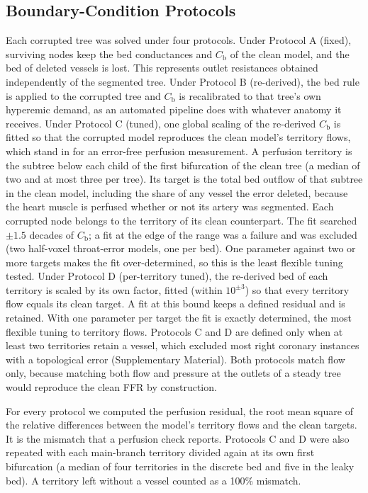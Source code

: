 \documentclass[journal,twoside,web]{ieeecolor}
\begin{document}
\subsection{Boundary-Condition Protocols}
Each corrupted tree was solved under four protocols. Under Protocol A (fixed), surviving
nodes keep the bed conductances and $C_\mathrm{b}$ of the clean model, and the bed of deleted vessels is lost. This represents
outlet resistances obtained independently of the segmented tree. Under Protocol B
(re-derived), the bed rule is applied to the corrupted tree and $C_\mathrm{b}$ is recalibrated to that tree's own hyperemic
demand, as an automated pipeline does with whatever anatomy it receives. Under Protocol C (tuned), one global
scaling of the re-derived $C_\mathrm{b}$ is fitted so that the corrupted model reproduces the clean model's territory
flows, which stand in for an error-free perfusion measurement. A perfusion territory is the subtree below each child of
the first bifurcation of the clean tree (a median of two and at most three per tree). Its target is the total bed outflow of that subtree in the clean model,
including the share of any vessel the error deleted, because the heart muscle is perfused whether or not its artery
was segmented. Each corrupted node belongs to the territory of its clean counterpart. The fit searched $\pm 1.5$ decades
of $C_\mathrm{b}$; a fit at the edge of the range was a failure and was excluded (two half-voxel throat-error models, one per bed).
One parameter against two or more targets makes the fit over-determined, so this is the least flexible tuning tested. Under Protocol D (per-territory tuned), the re-derived bed of each territory is scaled by its own factor, fitted (within $10^{\pm 3}$) so that every territory flow equals its clean target. A fit at this bound keeps a defined residual and is retained. With one parameter per target the fit is
exactly determined, the most flexible tuning to territory flows. Protocols C and D are defined only when at least two territories retain a vessel, which excluded most right coronary
instances with a topological error (Supplementary Material). Both protocols match
flow only, because matching both flow and pressure at the outlets of a steady tree would reproduce the clean FFR by
construction.

For every protocol we computed the perfusion residual, the root mean square of the relative differences between the
model's territory flows and the clean targets. It is the mismatch that a perfusion check reports. Protocols C and D were also repeated with each main-branch territory divided again at its own first bifurcation (a median of four territories in the discrete bed and five in the leaky bed). A territory left without a vessel counted as a 100\% mismatch.
\end{document}
